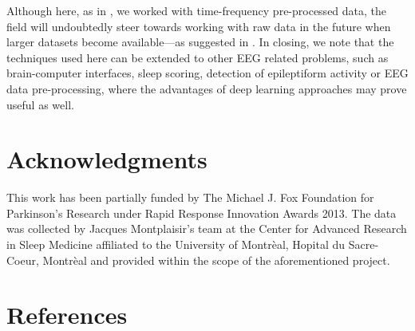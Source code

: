 \documentclass[review]{elsarticle}
\begin{document}
Although here, as in \cite{Vilamala:2017aa}, we worked with time-frequency pre-processed data, the field will undoubtedly steer towards working with raw data in the future when larger datasets become available---as suggested in \cite{Schirrmeister:2017aa}. 
 In closing, we note that the techniques used here can be extended to other EEG related problems, such as brain-computer interfaces, sleep scoring, detection of epileptiform activity or EEG data pre-processing, where the advantages of deep learning approaches may prove useful as well. 
 




 
\section*{Acknowledgments} This work has been partially funded by The Michael J. Fox Foundation for Parkinson's Research under Rapid Response Innovation Awards 2013. 
The data was collected by Jacques Montplaisir's team at the Center for Advanced Research in Sleep Medicine affiliated to the University of Montr\`eal, Hopital du Sacre-Coeur, Montr\`eal and provided within the scope of the aforementioned project.

\section*{References}


\end{document}
